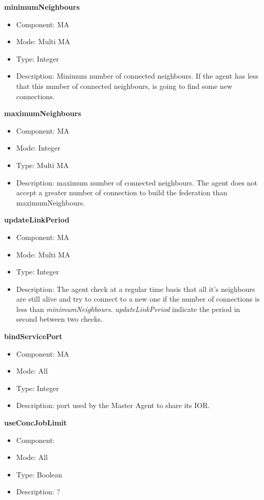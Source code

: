 \begin{description}
\item{\bf{minimumNeighbours}}
  \begin{itemize}
  \item Component: MA
  \item Mode: Multi MA
  \item Type: Integer
  \item Description: Minimum number of connected neighbours. If the
    agent has less that this number of connected neighbours, is going to
    find some new connections. 
  \end{itemize}

\item{\bf{maximumNeighbours}}
  \begin{itemize}
  \item Component: MA
  \item Mode: Integer 
  \item Type: Multi MA
  \item Description: maximum number of connected neighbours. The agent
    does not accept a greater number of connection to build the federation
    than maximumNeighbours.
  \end{itemize}

\item{\bf{updateLinkPeriod}}
  \begin{itemize}
  \item Component: MA
  \item Mode: Multi MA
  \item Type: Integer
  \item Description: The agent check at a regular time basis that all
    it's neighbours are still alive and try to connect to a new one if the
    number of connections is less than
    \emph{minimumNeighbours}. \emph{updateLinkPeriod} indicate the period
    in second between two checks.
  \end{itemize}

\item{\bf{bindServicePort}}
  \begin{itemize}
  \item Component: MA
  \item Mode: All
  \item Type: Integer
  \item Description: port used by the Master Agent to share its IOR.
  \end{itemize}

\item{\bf{useConcJobLimit}}
  \begin{itemize}
  \item Component: \sed
  \item Mode: All
  \item Type: Boolean
  \item Description: ?
  \end{itemize}


\end{description}
